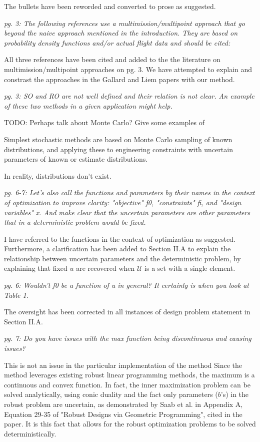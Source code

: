 \documentclass[11pt]{article}
\begin{document}
The bullets have been reworded and converted to prose as suggested. 

\textit{pg. 3: The following references use a multimission/multipoint approach that go beyond the naive approach mentioned in the introduction. They are based on probability density functions and/or actual flight data and should be cited:}

All three references have been cited and added to the the literature on multimission/multipoint approaches on pg. 3. 
We have attempted to explain and constrast the approaches in the Gallard and Liem papers
with our method. 

\textit{pg. 3: SO and RO are not well defined and their relation is not clear. An example of these two methods in a given application might help.}

TODO: Perhaps talk about Monte Carlo? Give some examples of 

Simplest stochastic methods are based on Monte Carlo sampling of known distributions, and applying these to engineering
constraints with uncertain parameters of known or estimate distributions.

In reality, distributions don't exist. 


\textit{pg. 6-7: Let's also call the functions and parameters by their names in the context of optimization to improve clarity: "objective" f0, "constraints" fi, and "design variables" x. And make clear that the uncertain parameters are other parameters that in a deterministic problem would be fixed.}

I have referred to the functions in the context of optimization as suggested. Furthermore, 
a clarification has been added to Section II.A to explain the relationship between uncertain parameters and the 
deterministic problem, by explaining that fixed $u$ are recovered when $\mathcal{U}$ is a set with a single element. 

\textit{pg. 6: Wouldn't f0 be a function of u in general? It certainly is when you look at Table 1.}

The oversight has been corrected in all instances of design problem statement in Section II.A. 

\textit{pg. 7: Do you have issues with the max function being discontinuous and causing issues?}

This is not an issue in the particular implementation of the method
Since the method leverages existing robust linear programming
methods, the maximum is a continuous and convex function. 
In fact, the inner maximization problem can be solved analytically, using conic
duality and the fact only parameters ($b$'s) in the robust problem are uncertain, 
as demonstrated by Saab et al. in Appendix A, Equation 29-35 of "Robust Designs via Geometric Programming", 
cited in the paper.
It is this fact that allows for the robust optimization problems to be solved deterministically. 
\end{document}
